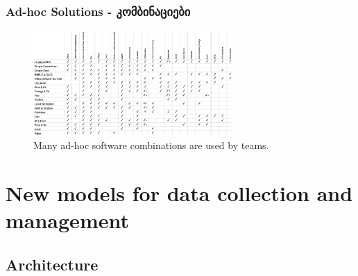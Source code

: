 \documentclass{beamer}
\begin{document}
\begin{frame}
\frametitle{Ad-hoc Solutions - კომბინაციები}

\begin{figure}
\begin{center}
\includegraphics[width=3in]{../figures/other_software}
\caption{Many ad-hoc software combinations are used by teams.}
\label{allothersoftware}
\end{center}
\end{figure}

\end{frame}


\section[LingSync]{New models for data collection and management}
\subsection{Architecture}\label{sec:lingsync}
\end{document}
